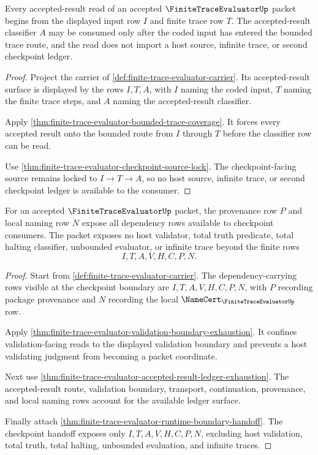 \begin{theorem}
\label{thm:finite-trace-evaluator-source-admission}
Every accepted-result read of an accepted $\FiniteTraceEvaluatorUp$ packet begins from the displayed input row $I$ and finite trace row $T$. The accepted-result classifier $A$ may be consumed only after the coded input has entered the bounded trace route, and the read does not import a host source, infinite trace, or second checkpoint ledger.
\end{theorem}
\begin{proof}
Project the carrier of \autoref{def:finite-trace-evaluator-carrier}. Its accepted-result surface is displayed by the rows $I,T,A$, with $I$ naming the coded input, $T$ naming the finite trace steps, and $A$ naming the accepted-result classifier.

Apply \autoref{thm:finite-trace-evaluator-bounded-trace-coverage}. It forces every accepted result onto the bounded route from $I$ through $T$ before the classifier row can be read.

Use \autoref{thm:finite-trace-evaluator-checkpoint-source-lock}. The checkpoint-facing source remains locked to $I \to T \to A$, so no host source, infinite trace, or second checkpoint ledger is available to the consumer.
\end{proof}

\begin{theorem}
\label{thm:finite-trace-evaluator-ledger-exhaustion}
For an accepted $\FiniteTraceEvaluatorUp$ packet, the provenance row $P$ and local naming row $N$ expose all dependency rows available to checkpoint consumers. The packet exposes no host validator, total truth predicate, total halting classifier, unbounded evaluator, or infinite trace beyond the finite rows
$$
I,T,A,V,H,C,P,N.
$$
\end{theorem}
\begin{proof}
Start from \autoref{def:finite-trace-evaluator-carrier}. The dependency-carrying rows visible at the checkpoint boundary are $I,T,A,V,H,C,P,N$, with $P$ recording package provenance and $N$ recording the local $\NameCert_{\FiniteTraceEvaluatorUp}$ row.

Apply \autoref{thm:finite-trace-evaluator-validation-boundary-exhaustion}. It confines validation-facing reads to the displayed validation boundary and prevents a host validating judgment from becoming a packet coordinate.

Next use \autoref{thm:finite-trace-evaluator-accepted-result-ledger-exhaustion}. The accepted-result route, validation boundary, transport, continuation, provenance, and local naming rows account for the available ledger surface.

Finally attach \autoref{thm:finite-trace-evaluator-runtime-boundary-handoff}. The checkpoint handoff exposes only $I,T,A,V,H,C,P,N$, excluding host validation, total truth, total halting, unbounded evaluation, and infinite traces.
\end{proof}

